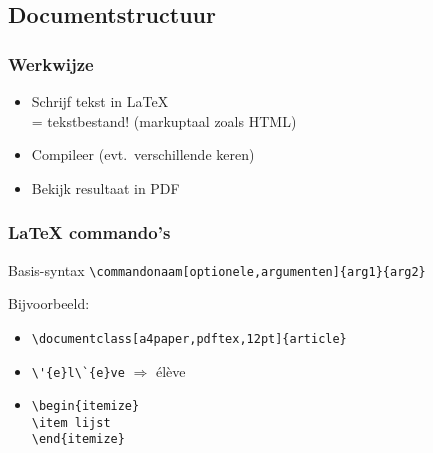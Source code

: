\documentclass[aspectratio=169]{beamer}
\begin{document}
\subsection{Documentstructuur}

\begin{frame}
  \frametitle{Werkwijze}

  \begin{itemize}
    \item<+-> Schrijf tekst in {\LaTeX}\\
    = tekstbestand! (markuptaal zoals HTML)
    \item<+-> Compileer (evt.\ verschillende keren)
    \item<+-> Bekijk resultaat in PDF
  \end{itemize}
\end{frame}

\begin{frame}[fragile]
  \frametitle{{\LaTeX} commando's}

  \begin{block}{Basis-syntax}
    \verb|\commandonaam[optionele,argumenten]{arg1}{arg2}|
  \end{block}

  \pause

  Bijvoorbeeld:

  \begin{itemize}
    \item<+-> \verb|\documentclass[a4paper,pdftex,12pt]{article}|
    \item<+-> \verb|\'{e}l\`{e}ve| \(\Rightarrow\) \'el\`eve
    \item<+-> \verb|\begin{itemize}|\\
    \verb|\item lijst|\\
    \verb|\end{itemize}|
  \end{itemize}

\end{frame}
\end{document}

